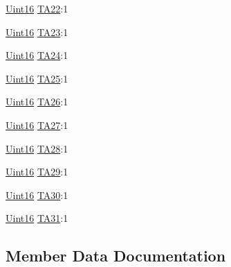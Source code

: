 \begin{DoxyCompactItemize}
\item 
\hyperlink{_d_s_p2833x___device_8h_a59a9f6be4562c327cbfb4f7e8e18f08b}{Uint16} \hyperlink{struct_c_a_n_t_a___b_i_t_s_ae399bc516c2fa0a67755581b9fb25e9d}{T\+A22}\+:1
\item 
\hyperlink{_d_s_p2833x___device_8h_a59a9f6be4562c327cbfb4f7e8e18f08b}{Uint16} \hyperlink{struct_c_a_n_t_a___b_i_t_s_a7998ee9edcfc0ed7a18228dff4878785}{T\+A23}\+:1
\item 
\hyperlink{_d_s_p2833x___device_8h_a59a9f6be4562c327cbfb4f7e8e18f08b}{Uint16} \hyperlink{struct_c_a_n_t_a___b_i_t_s_a01c64ed35394f7605824920d5c8c21af}{T\+A24}\+:1
\item 
\hyperlink{_d_s_p2833x___device_8h_a59a9f6be4562c327cbfb4f7e8e18f08b}{Uint16} \hyperlink{struct_c_a_n_t_a___b_i_t_s_a919fd245c84f1353ae20ca2ce2a3685d}{T\+A25}\+:1
\item 
\hyperlink{_d_s_p2833x___device_8h_a59a9f6be4562c327cbfb4f7e8e18f08b}{Uint16} \hyperlink{struct_c_a_n_t_a___b_i_t_s_a8064189e5ea0e66959137dc7112d7bbe}{T\+A26}\+:1
\item 
\hyperlink{_d_s_p2833x___device_8h_a59a9f6be4562c327cbfb4f7e8e18f08b}{Uint16} \hyperlink{struct_c_a_n_t_a___b_i_t_s_a4fe4fe68beb3f98763e698bb937b52cf}{T\+A27}\+:1
\item 
\hyperlink{_d_s_p2833x___device_8h_a59a9f6be4562c327cbfb4f7e8e18f08b}{Uint16} \hyperlink{struct_c_a_n_t_a___b_i_t_s_a8d04666bbdbff9edd0a2dc8b19ed5fb9}{T\+A28}\+:1
\item 
\hyperlink{_d_s_p2833x___device_8h_a59a9f6be4562c327cbfb4f7e8e18f08b}{Uint16} \hyperlink{struct_c_a_n_t_a___b_i_t_s_abbd7d3bc3f5e6383a63632b69da39b74}{T\+A29}\+:1
\item 
\hyperlink{_d_s_p2833x___device_8h_a59a9f6be4562c327cbfb4f7e8e18f08b}{Uint16} \hyperlink{struct_c_a_n_t_a___b_i_t_s_ac3b807b67b2a5829fbdc2e5eb9af7cad}{T\+A30}\+:1
\item 
\hyperlink{_d_s_p2833x___device_8h_a59a9f6be4562c327cbfb4f7e8e18f08b}{Uint16} \hyperlink{struct_c_a_n_t_a___b_i_t_s_a1e6ae85aa6a4f5dc5ac5c22ba6832524}{T\+A31}\+:1
\end{DoxyCompactItemize}


\subsection{Member Data Documentation}
\hypertarget{struct_c_a_n_t_a___b_i_t_s_aee9410495cc3bf5d3fde4c4d52dad9dc}{}
